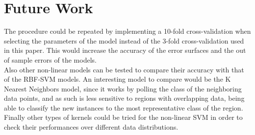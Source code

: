 \documentclass[10pt, journal]{IEEEtran}
\begin{document}
\section{Future Work} %
\label{sec:future_work}
The procedure could be repeated by implementing a 10-fold cross-validation when selecting the parameters of the model instead of the 3-fold cross-validation used in this paper. This would increase the accuracy of the error surfaces and the out of sample errors of the models.\\

Also other non-linear models can be tested to compare their accuracy with that of the RBF-SVM models. An interesting model to compare would be the K Nearest Neighbors model, since it works by polling the class of the neighboring data points, and as such is less sensitive to regions with overlapping data, being able to classify the new instances to the most representative class of the region.\\

Finally other types of kernels could be tried for the non-linear SVM in order to check their performances over different data distributions.\\



\end{document}
